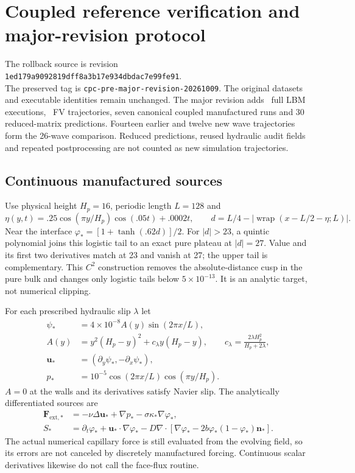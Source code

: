 \section{Coupled reference verification and major-revision protocol}
The rollback source is revision\\
\texttt{1ed179a9092819dff8a3b17e934dbdac7e99fe91}.\\
The preserved tag is \nolinkurl{cpc-pre-major-revision-20261009}.
The original datasets and executable identities remain unchanged.
The major revision adds \MajorNewNativeCount\ full LBM executions,
\MajorReferenceCount\ FV trajectories, seven canonical coupled manufactured
runs and 30 reduced-matrix predictions. Fourteen earlier and twelve new
wave trajectories form the 26-wave comparison.
Reduced predictions, reused hydraulic audit fields and repeated
postprocessing are not counted as new simulation trajectories.

\subsection{Continuous manufactured sources}
Use physical height $H_p=16$, periodic length $L=128$ and
\begin{equation}
 \eta(y,t)=.25\cos(\pi y/H_p)\cos(.05t)+.0002t,\qquad
 d=L/4-|\operatorname{wrap}(x-L/2-\eta;L)|.
\end{equation}
Near the interface $\varphi_*=[1+\tanh(.62d)]/2$.
For $|d|>23$, a quintic polynomial joins this logistic tail to an exact pure
plateau at $|d|=27$. Value and its first two derivatives match at 23 and
vanish at 27; the upper tail is complementary. This $C^2$ construction
removes the absolute-distance cusp in the pure bulk and changes only
logistic tails below $5\times10^{-13}$.
It is an analytic target, not numerical clipping.

For each prescribed hydraulic slip $\lambda$ let
\begin{align}
 \psi_*&=4\times10^{-8} A(y)\sin(2\pi x/L),\\
 A(y)&=y^2(H_p-y)^2+c_\lambda y(H_p-y),\qquad
 c_\lambda=\frac{2\lambda H_p^2}{H_p+2\lambda},\\
 \bm u_*&=(\partial_y\psi_*,-\partial_x\psi_*),\\
 p_*&=10^{-5}\cos(2\pi x/L)\cos(\pi y/H_p).
\end{align}
$A=0$ at the walls and its derivatives satisfy Navier slip.
The analytically differentiated sources are
\begin{align}
 \bm F_{\mathrm{ext},*}
 &=-\nu\Delta\bm u_*+\nabla p_*-\sigma\kappa_*\nabla\varphi_*,\\
 S_*&=\partial_t\varphi_*+\bm u_*\cdot\nabla\varphi_*
 -D\nabla\cdot[\nabla\varphi_*-2b\varphi_*(1-\varphi_*)\bm n_*].
\end{align}
The actual numerical capillary force is still evaluated from the evolving
field, so its errors are not canceled by discretely manufactured forcing.
Continuous scalar derivatives likewise do not call the face-flux routine.

